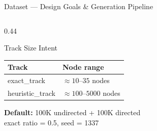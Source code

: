 \documentclass[aspectratio=169,10pt]{beamer}
\renewcommand{\footnotesize}{\tiny}
\begin{document}
\begin{frame}{Dataset — Design Goals \& Generation Pipeline}
\begin{columns}[T]
\begin{column}{0.44\textwidth}
      \begin{block}{Track Size Intent}
        \begin{tabular}{ll}
          \toprule
          Track & Node range\\
          \midrule
          exact\_track & $\approx 10$--$35$ nodes\\
          heuristic\_track & $\approx 100$--$5000$ nodes\\
          \bottomrule
        \end{tabular}
      \end{block}
      \vspace{4pt}
      \begin{tcolorbox}[greenbox,fontupper=\footnotesize]
        \textbf{Default:} 100K undirected + 100K directed\\
        exact ratio = 0.5, seed = 1337
      \end{tcolorbox}
    \end{column}
  \end{columns}
\end{frame}
\end{document}
